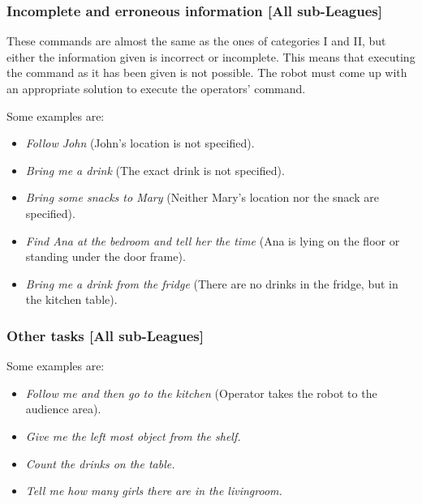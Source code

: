 \subsubsection{Incomplete and erroneous information [All sub-Leagues]}
These commands are almost the same as the ones of categories I and II, but either the information given is incorrect or incomplete. This means that executing the command as it has been given is not possible. The robot must come up with an appropriate solution to execute the operators' command.

Some examples are:
\begin{itemize}
	\item \textit{Follow John} (John's location is not specified).
	\item \textit{Bring me a drink} (The exact drink is not specified).
	\item \textit{Bring some snacks to Mary} (Neither Mary's location nor the snack are specified).
	\item \textit{Find Ana at the bedroom and tell her the time} (Ana is lying on the floor or standing under the door frame).
	\item \textit{Bring me a drink from the fridge} (There are no drinks in the fridge, but in the kitchen table).
\end{itemize}

\subsubsection{Other tasks [All sub-Leagues]}
Some examples are:
\begin{itemize}
	\item \textit{Follow me and then go to the kitchen} (Operator takes the robot to the audience area).
	\item \textit{Give me the left most object from the shelf.}
	\item \textit{Count the drinks on the table.}
	\item \textit{Tell me how many girls there are in the livingroom.}
\end{itemize}


